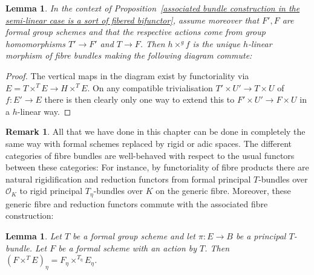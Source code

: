 \documentclass[10pt,oneside]{amsart}
\newtheorem{lemma}[theorem]{Lemma}
\theoremstyle{definition}
\newtheorem{remark}[theorem]{Remark}
\begin{document}
	\begin{lemma}\label{universal property of associated fibre construction in the semilinear case}
		In the context of Proposition~\ref{associated bundle construction in the semi-linear case is a sort of fibered bifunctor}, assume moreover that $F',F$ are formal group schemes and that the respective actions come from group homomorphisms $T'\to F'$ and $T\to F$.
		Then $h\times^g f$ is the unique $h$-linear morphism of fibre bundles making the following diagram commute:
		\begin{center}
		\end{center}
	\end{lemma}
	\begin{proof}
		 The vertical maps in the diagram exist by functoriality via $E=T\times^{T}E\rightarrow H\times^{T}E$. 
		On any compatible trivialisation $T'\times U'\rightarrow T\times U$ of $f:E'\rightarrow E$ there is then clearly only one way to extend this to $F'\times U'\rightarrow F\times U$ in a $h$-linear way.
	\end{proof}
	
	\begin{remark}\label{appendix in the case of rigid spaces and schemes}
	All that we have done in this chapter can be done in completely the same way with formal schemes replaced by rigid or adic spaces. The different categories of fibre bundles are well-behaved with respect to the usual functors between these categories: For instance, by functoriality of fibre products there are natural rigidification and reduction functors from formal principal $T$-bundles over $\mathcal O_K$ to rigid principal $T_\eta$-bundles over $K$ on the generic fibre. Moreover, these generic fibre and reduction functors commute with the associated fibre construction:
	\end{remark}
	\begin{lemma}\label{associated bundle commutes with generic fibre}
		Let $T$ be a formal group scheme and let $\pi:E\rightarrow B$ be a principal $T$-bundle. Let $F$ be a formal scheme with an action by $T$. Then $(F\times^T E)_\eta = F_\eta\times^{T_\eta} E_\eta$.
	\end{lemma}
  
\end{document}
